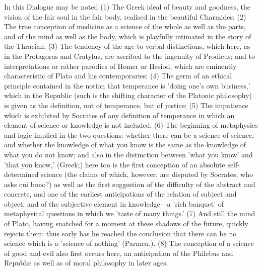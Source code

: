 \documentclass[11pt,letter]{article}
\begin{document}
\par  In this Dialogue may be noted (1) The Greek ideal of beauty and goodness, the vision of the fair soul in the fair body, realised in the beautiful Charmides; (2) The true conception of medicine as a science of the whole as well as the parts, and of the mind as well as the body, which is playfully intimated in the story of the Thracian; (3) The tendency of the age to verbal distinctions, which here, as in the Protagoras and Cratylus, are ascribed to the ingenuity of Prodicus; and to interpretations or rather parodies of Homer or Hesiod, which are eminently characteristic of Plato and his contemporaries; (4) The germ of an ethical principle contained in the notion that temperance is 'doing one's own business,' which in the Republic (such is the shifting character of the Platonic philosophy) is given as the definition, not of temperance, but of justice; (5) The impatience which is exhibited by Socrates of any definition of temperance in which an element of science or knowledge is not included; (6) The beginning of metaphysics and logic implied in the two questions: whether there can be a science of science, and whether the knowledge of what you know is the same as the knowledge of what you do not know; and also in the distinction between 'what you know' and 'that you know,' (Greek;) here too is the first conception of an absolute self-determined science (the claims of which, however, are disputed by Socrates, who asks cui bono?) as well as the first suggestion of the difficulty of the abstract and concrete, and one of the earliest anticipations of the relation of subject and object, and of the subjective element in knowledge—a 'rich banquet' of metaphysical questions in which we 'taste of many things.' (7) And still the mind of Plato, having snatched for a moment at these shadows of the future, quickly rejects them: thus early has he reached the conclusion that there can be no science which is a 'science of nothing' (Parmen.). (8) The conception of a science of good and evil also first occurs here, an anticipation of the Philebus and Republic as well as of moral philosophy in later ages.
\end{document}
